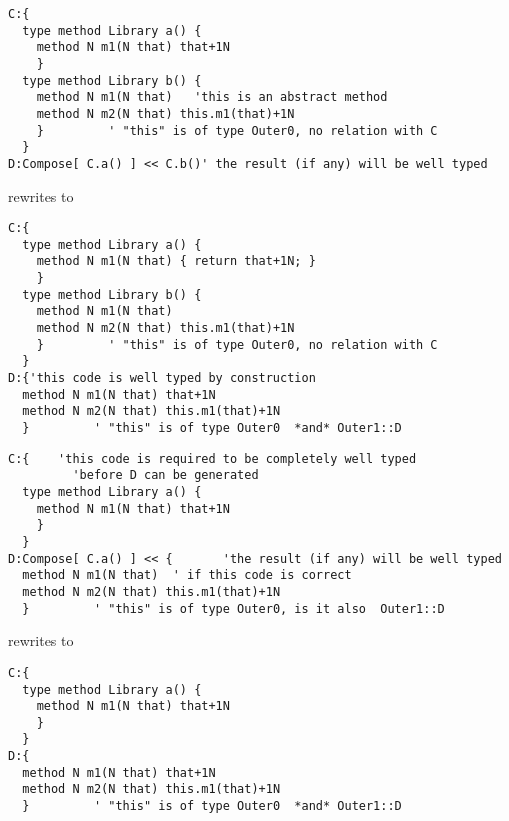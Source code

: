 \begin{frame}[fragile]
\begin{NiceCode}{59ex}{0.8}
\begin{lstlisting}
C:{  
  type method Library a() {
    method N m1(N that) that+1N
    }
  type method Library b() {
    method N m1(N that)   'this is an abstract method
    method N m2(N that) this.m1(that)+1N
    }         ' "this" is of type Outer0, no relation with C
  }
D:Compose[ C.a() ] << C.b()' the result (if any) will be well typed
\end{lstlisting}
\end{NiceCode}
rewrites to 

\begin{NiceCode}{59ex}{0.8}
\begin{lstlisting}
C:{
  type method Library a() {
    method N m1(N that) { return that+1N; }
    }
  type method Library b() {
    method N m1(N that)  
    method N m2(N that) this.m1(that)+1N
    }         ' "this" is of type Outer0, no relation with C
  }
D:{'this code is well typed by construction
  method N m1(N that) that+1N
  method N m2(N that) this.m1(that)+1N
  }         ' "this" is of type Outer0  *and* Outer1::D
\end{lstlisting}
\end{NiceCode}
\end{frame}



\begin{frame}[fragile]
\begin{NiceCode}{59ex}{0.8}
\begin{lstlisting}
C:{    'this code is required to be completely well typed 
         'before D can be generated
  type method Library a() {
    method N m1(N that) that+1N
    }
  }
D:Compose[ C.a() ] << {       'the result (if any) will be well typed
  method N m1(N that)  ' if this code is correct
  method N m2(N that) this.m1(that)+1N
  }         ' "this" is of type Outer0, is it also  Outer1::D
\end{lstlisting}
\end{NiceCode}
rewrites to 

\begin{NiceCode}{59ex}{0.8}
\begin{lstlisting}
C:{  
  type method Library a() {
    method N m1(N that) that+1N
    }
  }
D:{
  method N m1(N that) that+1N
  method N m2(N that) this.m1(that)+1N
  }         ' "this" is of type Outer0  *and* Outer1::D
\end{lstlisting}
\end{NiceCode}
\end{frame}


